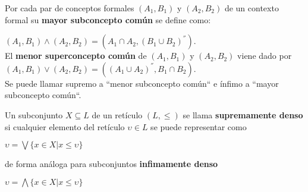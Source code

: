 \documentclass[../../main.tex]{subfiles}
\begin{document}
\begin{definicion}
Por cada par de conceptos formales $(A_1, B_1)$ y $(A_2, B_2)$ de un contexto formal su \textbf{mayor subconcepto común} se define como:
\begin{center}
    $(A_1, B_1) \wedge (A_2, B_2) = (A_1 \cap A_2, (B_1 \cup B_2)^{''}) $. \\
    El \textbf{menor superconcepto común} de $(A_1, B_1)$ y $(A_2, B_2)$ viene dado por \\
    $(A_1, B_1) \vee (A_2, B_2) = ((A_1 \cup A_2)^{''}, B_1 \cap B_2) $. \\
    Se puede llamar supremo a ``menor subconcepto común`` e ínfimo a ``mayor subconcepto común``.
\end{center}
\end{definicion}



\begin{definicion}
Un subconjunto $X \subseteq L$ de un retículo $(L, \leq)$ se llama \textbf{supremamente denso} si cualquier elemento del retículo $\upsilon \in L$ se puede representar como
\begin{center}
    $\upsilon = \bigvee \{ x \in X | x \leq \upsilon \}$
\end{center}
de forma análoga para subconjuntos \textbf{infimamente denso}
\begin{center}
    $\upsilon = \bigwedge \{ x \in X | x \leq \upsilon \}$
\end{center}
\end{definicion}

\end{document}
